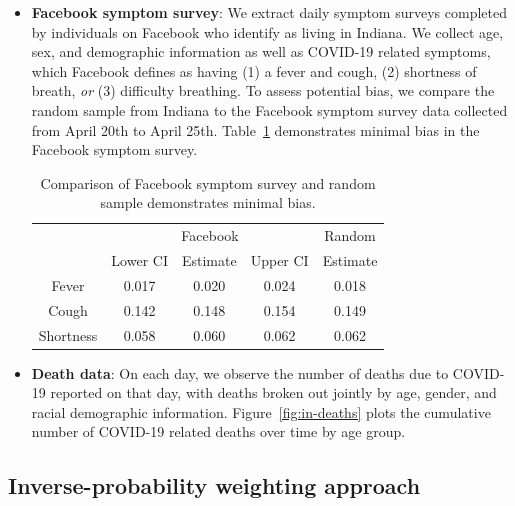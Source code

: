 \documentclass[12pt]{amsart}
\numberwithin{equation}{section}
\theoremstyle{plain}
\begin{document}
\begin{itemize}[leftmargin=*]
\item {\bf Facebook symptom survey}: We extract daily symptom surveys completed by individuals on Facebook who identify as living in Indiana.  We collect age, sex, and demographic information as well as COVID-19 related symptoms, which Facebook defines as having (1) a fever and cough, (2) shortness of breath, \emph{or} (3) difficulty breathing. To assess potential bias, we compare the random sample from Indiana to the Facebook symptom survey data collected from April 20th to April 25th.  Table~\ref{tab:comparison} demonstrates minimal bias in the Facebook symptom survey.
\begin{table}
\centering
\begin{tabular}{c | c c c | c}
& \multicolumn{3}{c}{Facebook} & Random \\ \cline{2-5}
& Lower CI & Estimate & Upper CI & Estimate \\ \hline
Fever &  0.017 & 0.020 & 0.024 & 0.018 \\
Cough &  0.142 & 0.148 & 0.154 & 0.149 \\
Shortness & 0.058 & 0.060 & 0.062 & 0.062 \\ \hline
\end{tabular}
\caption{Comparison of Facebook symptom survey and random sample demonstrates minimal bias.}
\label{tab:comparison}
\end{table}


\item {\bf Death data}: On each day, we observe the number of deaths due to COVID-19 reported on that day, with deaths broken out jointly by age, gender, and racial demographic information.  Figure~\ref{fig:in-deaths} plots the cumulative number of COVID-19 related deaths over time by age group.
\end{itemize}


\subsection{Inverse-probability weighting approach}
\end{document}
